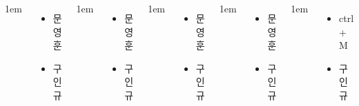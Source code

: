 \documentclass[	20pt, 
							a1paper, 
							portrait, %
							margin=0mm, %
							innermargin=10mm,  		%
							colspace=5mm, 
							subcolspace=0mm
							]{tikzposter}
\begin{document}
\begin{columns}
			{
					\setlength{\leftmargini}{4em}
					\setlength{\labelsep} {1em}
					\begin{itemize}
					\item  문영훈 
					\item  구인규 
					\end{itemize}
			} %


			{
					\setlength{\leftmargini}{4em}
					\setlength{\labelsep} {1em}
					\begin{itemize}
					\item  문영훈 
					\item  구인규 
					\end{itemize}
			} %


			{
					\setlength{\leftmargini}{4em}
					\setlength{\labelsep} {1em}
					\begin{itemize}
					\item  문영훈 
					\item  구인규 
					\end{itemize}
			} %

			{
					\setlength{\leftmargini}{4em}
					\setlength{\labelsep} {1em}
					\begin{itemize}
					\item  문영훈 
					\item  구인규 
					\end{itemize}
			} %


			{
					\setlength{\leftmargini}{4em}
					\setlength{\labelsep} {1em}
					\begin{itemize}
					\item  ctrl + M
					\item  구인규 
					\end{itemize}
			} %



	\end{columns}
\end{document}
